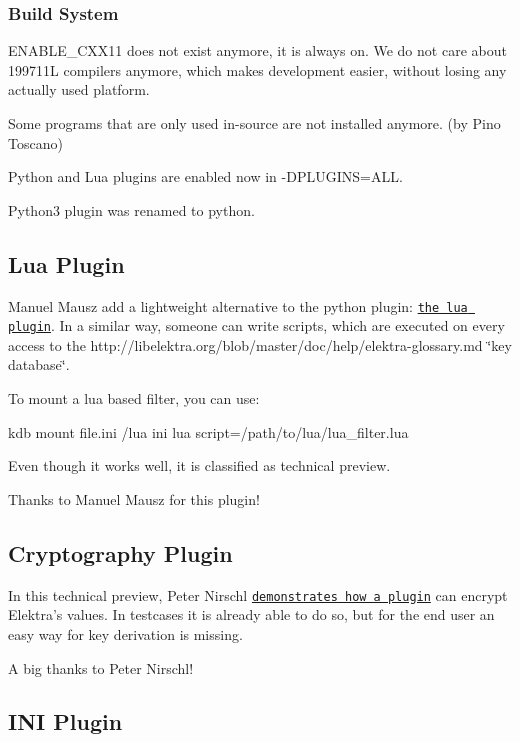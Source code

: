 \subsubsection*{Build System}

E\+N\+A\+B\+L\+E\+\_\+\+C\+X\+X11 does not exist anymore, it is always on. We do not care about 199711\+L compilers anymore, which makes development easier, without losing any actually used platform.

Some programs that are only used in-\/source are not installed anymore. (by Pino Toscano)

Python and Lua plugins are enabled now in {\ttfamily -\/\+D\+P\+L\+U\+G\+I\+N\+S=A\+L\+L}.

Python3 plugin was renamed to python.

\subsection*{Lua Plugin}

Manuel Mausz add a lightweight alternative to the python plugin\+: \href{http://libelektra.org/blob/master/src/plugins/lua/}{\tt the lua plugin}. In a similar way, someone can write scripts, which are executed on every access to the http\+://libelektra.org/blob/master/doc/help/elektra-\/glossary.\+md \char`\"{}key database\char`\"{}.

To mount a lua based filter, you can use\+: \begin{DoxyVerb}kdb mount file.ini /lua ini lua script=/path/to/lua/lua_filter.lua
\end{DoxyVerb}


Even though it works well, it is classified as technical preview.

Thanks to Manuel Mausz for this plugin!

\subsection*{Cryptography Plugin}

In this technical preview, Peter Nirschl \href{http://libelektra.org/blob/master/src/plugins/crypto/}{\tt demonstrates how a plugin} can encrypt Elektra's values. In testcases it is already able to do so, but for the end user an easy way for key derivation is missing.

A big thanks to Peter Nirschl!

\subsection*{I\+N\+I Plugin}

